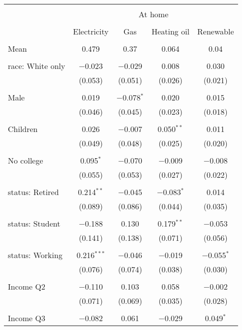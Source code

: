 
\begin{tabular}{@{\extracolsep{5pt}}lcccc} 
\\[-1.8ex]\hline 
\hline \\[-1.8ex] 
 & \multicolumn{4}{c}{At home} \\ 
\cline{2-5} 
\\[-1.8ex] & Electricity & Gas & Heating oil & Renewable \\ 
\hline \\[-1.8ex] 
 Mean & 0.479 & 0.37 & 0.064 & 0.04  \\ \hline \\[-1.8ex] race: White only & $-$0.023 & $-$0.029 & 0.008 & 0.030 \\ 
  & (0.053) & (0.051) & (0.026) & (0.021) \\ 
  & & & & \\ 
 Male & 0.019 & $-$0.078$^{*}$ & 0.020 & 0.015 \\ 
  & (0.046) & (0.045) & (0.023) & (0.018) \\ 
  & & & & \\ 
 Children & 0.026 & $-$0.007 & 0.050$^{**}$ & 0.011 \\ 
  & (0.049) & (0.048) & (0.025) & (0.020) \\ 
  & & & & \\ 
 No college & 0.095$^{*}$ & $-$0.070 & $-$0.009 & $-$0.008 \\ 
  & (0.055) & (0.053) & (0.027) & (0.022) \\ 
  & & & & \\ 
 status: Retired & 0.214$^{**}$ & $-$0.045 & $-$0.083$^{*}$ & 0.014 \\ 
  & (0.089) & (0.086) & (0.044) & (0.035) \\ 
  & & & & \\ 
 status: Student & $-$0.188 & 0.130 & 0.179$^{**}$ & $-$0.053 \\ 
  & (0.141) & (0.138) & (0.071) & (0.056) \\ 
  & & & & \\ 
 status: Working & 0.216$^{***}$ & $-$0.046 & $-$0.019 & $-$0.055$^{*}$ \\ 
  & (0.076) & (0.074) & (0.038) & (0.030) \\ 
  & & & & \\ 
 Income Q2 & $-$0.110 & 0.103 & 0.058 & $-$0.002 \\ 
  & (0.071) & (0.069) & (0.035) & (0.028) \\ 
  & & & & \\ 
 Income Q3 & $-$0.082 & 0.061 & $-$0.029 & 0.049$^{*}$ \\ 

\end{tabular}
